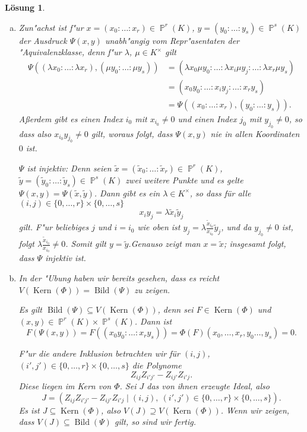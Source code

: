 \documentclass[a4paper, 12pt, numbers=noendperiod, chapterprefix=true]{scrbook}
\theoremstyle{break}
\newtheorem{Loes}{L\"osung}
\theoremstyle{nonumberbreak}
\theoremstyle{nonumberplain}
\DeclareMathOperator{\Bild}{Bild}
\DeclareMathOperator{\Kern}{Kern}
\newcommand{\A}{\mathbb{A}}
\DeclareMathOperator{\Projective}{\mathbb{P}} %
\begin{document}
\begin{Loes}\begin{enumerate}[a)]
\item
	Zun"achst ist f"ur $x = (x_0:\ldots:x_r)\in \Projective^r(K)$, $y = (y_0:\ldots:y_s)\in \Projective^s(K)$ der Ausdruck $\Psi(x,y)$ unabh"angig vom Repr"asentaten der "Aquivalenzklasse, denn f"ur $\lambda$, $\mu \in K^\times$ gilt
	\begin{align*}
		\Psi((\lambda x_0:\ldots:\lambda x_r), (\mu y_0:\ldots:\mu y_s)) &= (\lambda x_0 \mu y_0: \ldots : \lambda x_i \mu y_j:\ldots: \lambda x_r \mu y_s )\\
		&= ( x_0y_0:\ldots: x_iy_j :\ldots: x_ry_s)\\
		&= \Psi((x_0:\ldots:x_r),(y_0:\ldots:y_s)).
	\end{align*}
	A\ss erdem gibt es einen Index $i_0$ mit $x_{i_0}\neq 0$ und einen Index $j_0$ mit $y_{j_0}\neq 0$, so dass also $x_{i_0}y_{j_0}\neq 0$ gilt, woraus folgt, dass $\Psi(x,y)$ nie in allen Koordinaten $0$ ist.
	
	\emph{$\Psi$ ist injektiv}: Denn seien $\tilde x =  (\tilde x_0:\ldots:\tilde x_r)\in \Projective^r(K)$, $\tilde y = (\tilde y_0:\ldots:\tilde y_s)\in \Projective^s(K)$ zwei weitere Punkte und es gelte $\Psi(x,y) = \Psi(\tilde x, \tilde y)$. Dann gibt es ein $\lambda\in K^\times$, so dass für alle $(i,j)\in \{0,\dots,r\}\times \{0,\dots, s\}$
		\[x_iy_j = \lambda \tilde x_i \tilde y_j\]
	gilt. F"ur beliebiges $j$ und $i = i_0$ wie oben ist $y_j = \lambda \tfrac{\tilde x_{i_0}}{x_{i_0}} \tilde y_j$, und da $y_{j_0}\neq 0$ ist, folgt $\lambda \tfrac{\tilde x_{i_0}}{x_{i_0}}\neq 0$. Somit gilt $y = \tilde y$.Genauso zeigt man $x= \tilde x$; insgesamt folgt, dass $\Psi$ injektiv ist.

\item
	In der "Ubung haben wir bereits gesehen, dass es reicht $V(\Kern(\Phi)) = \Bild(\Psi)$ zu zeigen.
	
	Es gilt $\Bild(\Psi)\subseteq V(\Kern(\Phi))$, denn sei $F\in \Kern(\Phi)$ und $(x,y)\in \Projective^r(K)\times \Projective^s(K)$. Dann ist
		\[F(\Psi(x,y)) = F(( x_0y_0:\ldots: x_ry_s)) = \Phi(F)(x_0,\ldots , x_r ,y_0\ldots ,y_s) = 0.\]
	
	F"ur die andere Inklusion betrachten wir für $(i,j)$, $(i',j') \in \{0,\dots,r\}\times\{0,\dots,s\}$ die Polynome
		\[Z_{ij}Z_{i'j'} - Z_{ij'}Z_{i'j}.\]
	Diese liegen im Kern von $\Phi$. Sei $J$ das von ihnen erzeugte Ideal, also
		\[J = (Z_{ij}Z_{i'j'} - Z_{ij'}Z_{i'j} \mid (i,j),\ (i',j') \in \{0,\dots,r\}\times\{0,\dots,s\}).\]
	Es ist $J\subseteq \Kern(\Phi)$, also $V(J)\supseteq V(\Kern(\Phi))$. Wenn wir zeigen, dass $V(J)\subseteq \Bild(\Psi)$ gilt, so sind wir fertig.


\end{enumerate}
\end{Loes}
\end{document}
